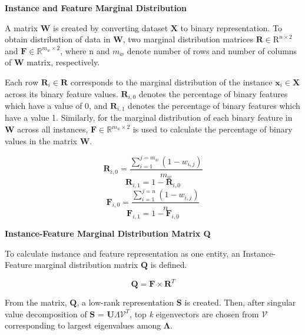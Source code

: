 \documentclass{article}
\begin{document}
\textbf{Instance and Feature Marginal Distribution}

A matrix $\mathbf{W}$ is created by converting dataset $\mathbf{X}$ to binary representation. To obtain distribution of data in $\mathbf{W}$, two marginal distribution matrices $\mathbf{R} \in \mathrm{R}^{n \times 2}$ and $\mathbf{F} \in \mathbb{R}^{m_w \times 2}$, where n and $m_w$ denote number of rows and number of columns of $\mathbf{W}$ matrix, respectively.

Each row $\mathbf{R}_i \in \mathbf{R}$ corresponds to the marginal distribution of the instance $\mathbf{x}_i \in \mathbf{X}$ across its binary feature values. $\mathbf{R}_{i,0}$ denotes the percentage of binary features which have a value of 0, and $\mathbf{R}_{i,1}$ denotes the percentage of binary features which have a value 1. Similarly, for the marginal distribution of each binary feature in $\mathbf{W}$ across all instances, $\mathbf{F} \in \mathbb{R}^{m_w \times 2}$ is used to calculate the percentage of binary values in the matrix $\mathbf{W}$. 

\begin{equation}
    \mathbf{R}_{i,0} = \frac{\sum^{j=m_w}_{i=1}(1 - w_{i,j})}{m_w}
\end{equation}
\begin{equation}
    \mathbf{R}_{i,1} = 1 - \mathbf{R}_{i,0}
\end{equation}
\begin{equation}
    \mathbf{F}_{i,0} = \frac{\sum^{j=n}_{i=1}(1 - w_{i,j})}{n}
\end{equation}
\begin{equation}
    \mathbf{F}_{i,1} = 1 - \mathbf{F}_{i,0}
\end{equation}

\textbf{Instance-Feature Marginal Distribution Matrix Q}

To calculate instance and feature representation as one entity, an Instance-Feature marginal distribution matrix $\mathbf{Q}$ is defined.

\begin{equation}
    \mathbf{Q} = \mathbf{F} \times \mathbf{R}^T
\end{equation}

From the matrix, $\mathbf{Q}$, a low-rank representation $\mathbf{S}$ is created.
Then, after singular value decomposition of $\mathbf{S}$ = $\mathbf{U}\Lambda\mathcal{V}^T$, top \textit{k} eigenvectors are chosen from $\mathcal{V}$ corresponding to largest eigenvalues among $\mathbf{\Lambda}$.
\end{document}
